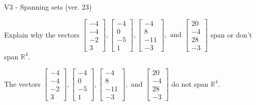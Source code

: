 \begin{exercise}
  \begin{exerciseTitle}V3 - Spanning sets (ver. 23)\end{exerciseTitle}
  \begin{exerciseStatement}
    Explain why the vectors \(\left[\begin{array}{r}
-4 \\
-4 \\
-2 \\
3
\end{array}\right] , \left[\begin{array}{r}
-4 \\
0 \\
-5 \\
1
\end{array}\right] , \left[\begin{array}{r}
-4 \\
8 \\
-11 \\
-3
\end{array}\right] , \text{ and } \left[\begin{array}{r}
20 \\
-4 \\
28 \\
-3
\end{array}\right]\) span or don't span \(\mathbb{R}^4\). 
	


  \end{exerciseStatement}
  \begin{exerciseAnswer}
   The vectors \(\left[\begin{array}{r}
-4 \\
-4 \\
-2 \\
3
\end{array}\right] , \left[\begin{array}{r}
-4 \\
0 \\
-5 \\
1
\end{array}\right] , \left[\begin{array}{r}
-4 \\
8 \\
-11 \\
-3
\end{array}\right] , \text{ and } \left[\begin{array}{r}
20 \\
-4 \\
28 \\
-3
\end{array}\right]\) 
  	 do not  
	span \(\mathbb{R}^4\).
  


  \end{exerciseAnswer}
\end{exercise}